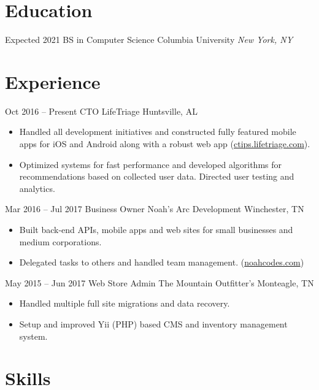 \documentclass[letterpaper]{moderncv}        %
\begin{document}
\makecvtitle
\section{Education}
\cventry
{Expected 2021}
{BS in Computer Science}
{Columbia University}
{}
{\textit{New York, NY}}
{}
\section{Experience}
\cventry
{Oct 2016 -- Present}
{CTO}
{LifeTriage}
{Huntsville, AL}
{}
{\begin{itemize}%
	\item Handled all development initiatives and constructed fully featured mobile apps for iOS and Android along with a robust web app (\href{https://ctips.lifetriage.com}{ctips.lifetriage.com}).
	\item Optimized systems for fast performance and developed algorithms for recommendations based on collected user data. Directed user testing and analytics.
	\end{itemize}}
\cventry
{Mar 2016 -- Jul 2017}
{Business Owner}
{Noah's Arc Development}
{Winchester, TN}
{}
{\begin{itemize}%
	\item  Built back-end APIs, mobile apps and web sites for small businesses and medium corporations.
	\item  Delegated tasks to others and handled team management. (\href{https://noahcodes.com/}{noahcodes.com})
	\end{itemize}}
\cventry
{May 2015 -- Jun 2017}
{Web Store Admin}
{The Mountain Outfitter's}
{Monteagle, TN}
{}
{\begin{itemize}%
	\item  Handled multiple full site migrations and data recovery.
	\item  Setup and improved Yii (PHP) based CMS and inventory management system.
	\end{itemize}}
\section{Skills}
\end{document}
